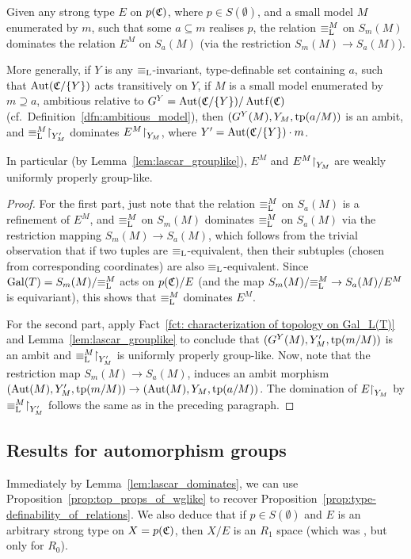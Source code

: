 	
	\begin{lem}
		\label{lem:lascar_dominates}
		Given any strong type $E$ on $p({\mathfrak C})$, where $p\in S(\emptyset)$, and a small model $M$ enumerated by $m$, such that some $a\subseteq m$ realises $p$, the relation $\equiv_{\mathrm{L}}^M$ on $S_m(M)$ dominates the relation $E^M$ on $S_a(M)$ (via the restriction $S_m(M)\to S_a(M)$).
		
		More generally, if $Y$ is any $\equiv_{\mathrm{L}}$-invariant, type-definable set containing $a$, such that $\operatorname{{Aut}}({\mathfrak C}/\{Y\})$ acts transitively on $Y$, if $M$ is a small model enumerated by $m\supseteq a$, ambitious relative to $G^Y=\Aut(\fC/\{Y\})/\Autf(\fC)$ (cf.\ Definition~\ref{dfn:ambitious_model}), then $(G^Y(M),Y_M,\operatorname{{tp}}(a/M))$ is an ambit, and ${\equiv_{\mathrm{L}}^M}\mathord{\upharpoonright}_{Y'_M}$ dominates $E^M\mathord{\upharpoonright}_{Y_M}$, where $Y'=\operatorname{{Aut}}({\mathfrak C}/\{Y\})\cdot m$.
		
		In particular (by Lemma~\ref{lem:lascar_grouplike}), $E^M$ and $E^M\mathord{\upharpoonright}_{Y_M}$ are weakly uniformly properly group-like.
	\end{lem}
	\begin{proof}
		For the first part, just note that the relation $\equiv_{\mathrm{L}}^M$ on $S_a(M)$ is a refinement of $E^M$, and $\equiv_{\mathrm{L}}^M$ on $S_m(M)$ dominates $\equiv_{\mathrm{L}}^M$ on $S_a(M)$ via the restriction mapping $S_m(M)\to S_a(M)$, which follows from the trivial observation that if two tuples are $\equiv_{\mathrm{L}}$-equivalent, then their subtuples (chosen from corresponding coordinates) are also $\equiv_{\mathrm{L}}$-equivalent. Since $\operatorname{{Gal}}(T)=S_m(M)/{\equiv_{\mathrm{L}}^M}$ acts on $p({\mathfrak C})/E$ (and the map $S_m(M)/{\equiv_{\mathrm{L}}^M}\to S_a(M)/E^M$ is equivariant), this shows that $\equiv_{\mathrm{L}}^M$ dominates $E^M$.
		
		For the second part, apply Fact~\ref{fct: characterization of topology on Gal_L(T)} and Lemma~\ref{lem:lascar_grouplike} to conclude that $(G^Y(M),Y'_M,\operatorname{{tp}}(m/M))$ is an ambit and ${\equiv_{\mathrm{L}}^M}\mathord{\upharpoonright}_{Y'_M}$ is uniformly properly group-like. Now, note that the restriction map $S_m(M)\to S_a(M)$, induces an ambit morphism $(\operatorname{{Aut}}(M),Y'_M,\operatorname{{tp}}(m/M))\to (\operatorname{{Aut}}(M),Y_M,\operatorname{{tp}}(a/M))$. The domination of $E\mathord{\upharpoonright}_{Y_M}$ by ${\equiv_{\mathrm{L}}^M}\mathord{\upharpoonright}_{Y'_M}$ follows the same as in the preceding paragraph.
	\end{proof}
	
	\subsection*{Results for automorphism groups}
	\begin{rem}
		\label{rem:wglike_closedness_to_typdef}
		Immediately by Lemma~\ref{lem:lascar_dominates}, we can use Proposition~\ref{prop:top_props_of_wglike} to recover Proposition~\ref{prop:type-definability_of_relations}. We also deduce that if $p\in S(\emptyset)$ and $E$ is an arbitrary strong type on $X=p({\mathfrak C})$, then $X/E$ is an $R_1$ space (which was \cite[Proposition 1.12]{KPR15}, but only for $R_0$).\xqed{\lozenge}
	\end{rem}
	
